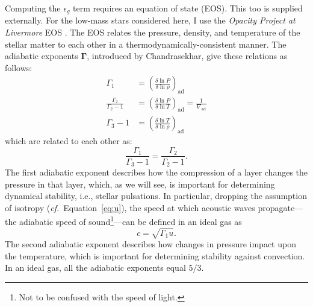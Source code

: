 \begin{description}
    Computing the $\epsilon_g$ term requires an equation of state (EOS). 
    This too is supplied externally. For the low-mass stars considered here, I use the \emph{Opacity Project at Livermore} EOS \citep[\textsc{OPAL},][]{2002apj...576.1064r}. 
    The EOS relates the pressure, density, and temperature of the stellar matter to each other in a thermodynamically-consistent manner. 
    The adiabatic exponents $\boldsymbol\Gamma$, introduced by Chandrasekhar, give these relations as follows: %
    \begin{align} 
        \Gamma_1 
        &= 
        \left(
            \frac{\delta \ln P}{\delta \ln \rho}
        \right)_{\text{ad}} 
        \\
        \frac{\Gamma_2}{\Gamma_2-1}
        &= \label{eq:gamma2}
        \left(
            \frac{\delta \ln P}{\delta \ln T}
        \right)_{\text{ad}} = \frac{1}{\nabla_{\text{ad}}}
        \\
        \Gamma_3 - 1 
        &= 
        \left(
            \frac{\delta \ln T}{\delta \ln \rho}
        \right)_{\text{ad}}
    \end{align}
    which are related to each other as: 
    \begin{equation}
        \frac{\Gamma_1}{\Gamma_3 - 1}
        =
        \frac{\Gamma_2}{\Gamma_2-1}.
    \end{equation}
    The first adiabatic exponent describes how the compression of a layer changes the pressure in that layer, which, as we will see, is important for determining dynamical stability, i.e., stellar pulsations. 
    In particular, dropping the assumption of isotropy (\emph{cf.}~Equation~\ref{eq:u}), the speed at which acoustic waves propagate---the adiabatic speed of sound\footnote{ Not to be confused with the speed of light.}---can be defined in an ideal gas as 
    \begin{equation} \label{eq:speed-of-sound}
        c = \sqrt{\Gamma_1 u}. 
    \end{equation}
    The second adiabatic exponent describes how changes in pressure impact upon the temperature, which is important for determining stability against convection. 
    In an ideal gas, all the adiabatic exponents equal $5/3$. %


\end{description}
